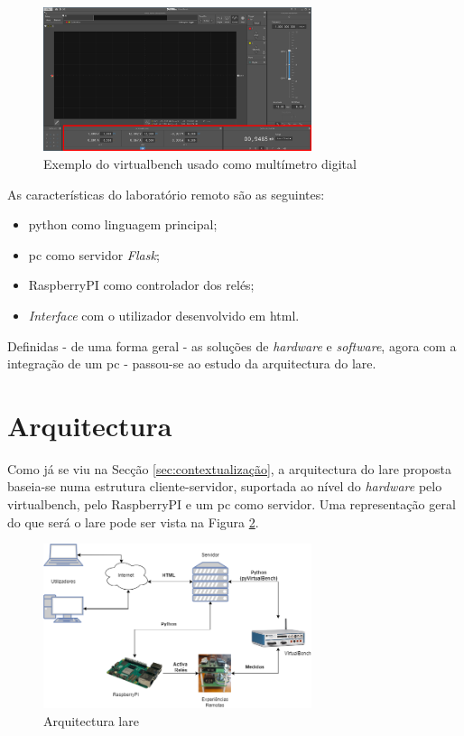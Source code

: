 \begin{figure}[hbtp]
    \centering
    \includegraphics[width=0.7\textwidth]{figures/VB8012-OHM_Exemplo.png}
    \caption{Exemplo do \acrshort{virtualbench} usado como multímetro digital}
    \label{fig:leituraohm}
\end{figure}

As características do \acrshort{laboratório remoto} são as seguintes:
\begin{itemize}
    \item \gls{python} como linguagem principal;
    \item \acrshort{pc} como servidor \textit{Flask};
    \item \gls{RaspberryPI} como controlador dos relés;
    \item \textit{Interface} com o utilizador desenvolvido em \acrshort{html}.
\end{itemize}

Definidas - de uma forma geral - as soluções de \textit{hardware} e \textit{software}, agora com a integração de um \acrshort{pc} - passou-se ao estudo da arquitectura do \acrshort{lare}.

\section{Arquitectura}
\label{sec:arquitectura}
Como já se viu na Secção \ref{sec:contextualização}, a arquitectura do \acrshort{lare} proposta baseia-se numa estrutura cliente-servidor, suportada ao nível do \textit{hardware} pelo \acrshort{virtualbench}, pelo \gls{RaspberryPI} e um \acrshort{pc} como servidor. Uma representação geral do que será o \acrshort{lare} pode ser vista na Figura \ref{fig:representaçãogerallare}.

\begin{figure}[hbtp]
    \centering
    \includegraphics[width=0.7\textwidth]{figures/arquitectura_ver2.drawio.png}
    \caption{Arquitectura \acrshort{lare}}
    \label{fig:representaçãogerallare}
\end{figure}

